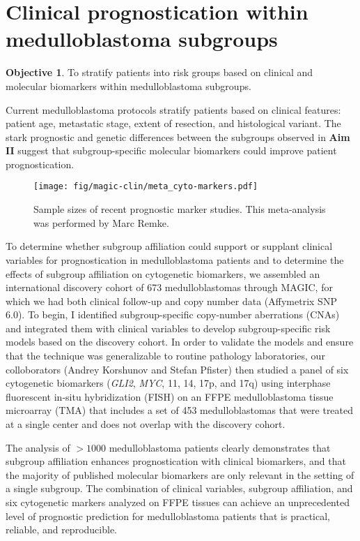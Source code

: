 \documentclass[11pt,letterpaper]{article}
\theoremstyle{definition}
\newtheorem*{objective}{Objective}
\begin{document}
\clearpage


\section{Clinical prognostication within medulloblastoma subgroups}

\begin{objective}
To stratify patients into risk groups based on clinical and molecular biomarkers within medulloblastoma subgroups.
\end{objective}

Current medulloblastoma protocols stratify patients based on clinical features: patient age, metastatic stage, extent of resection, and histological variant. The stark prognostic and genetic differences between the subgroups observed in \textbf{Aim II} suggest that subgroup-specific molecular biomarkers could improve patient prognostication.

\begin{SCfigure}[5][t]
	\texttt{[image: fig/magic-clin/meta\_cyto-markers.pdf]}
	\caption[Sample sizes of recent prognostic marker studies]
	{
	Sample sizes of recent prognostic marker studies.
	This meta-analysis was performed by Marc Remke.
	}
	\label{fig:meta_cyto-markers}
\end{SCfigure}

To determine whether subgroup affiliation could support or supplant clinical variables for prognostication in medulloblastoma patients and to determine the effects of subgroup affiliation on cytogenetic biomarkers, we assembled an international discovery cohort of 673 medulloblastomas through MAGIC, for which we had both clinical follow-up and copy number data (Affymetrix SNP 6.0). To begin, I identified subgroup-specific copy-number aberrations (CNAs) and integrated them with clinical variables to develop subgroup-specific risk models based on the discovery cohort. In order to validate the models and ensure that the technique was generalizable to routine pathology laboratories, our colloborators (Andrey Korshunov and Stefan Pfister) then studied a panel of six cytogenetic biomarkers (\emph{GLI2}, \emph{MYC}, 11, 14, 17p, and 17q) using interphase fluorescent in-situ hybridization (FISH) on an FFPE medulloblastoma tissue microarray (TMA) that includes a set of 453 medulloblastomas that were treated at a single center and does not overlap with the discovery cohort.

The analysis of $> 1000$ medulloblastoma patients clearly demonstrates that subgroup affiliation enhances prognostication with clinical biomarkers, and that the majority of published molecular biomarkers are only relevant in the setting of a single subgroup. The combination of clinical variables, subgroup affiliation, and six cytogenetic markers analyzed on FFPE tissues can achieve an unprecedented level of prognostic prediction for medulloblastoma patients that is practical, reliable, and reproducible.
\end{document}

